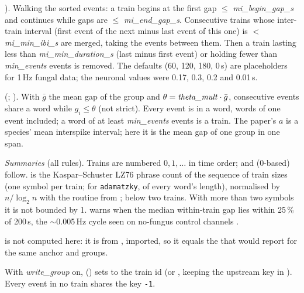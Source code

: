 \begin{description}
  \citet{cotterill2016comparison}). Walking the sorted events: a train begins at the first
  gap $\le$ \emph{mi\_begin\_gap\_s} and continues while gaps are $\le$
  \emph{mi\_end\_gap\_s}. Consecutive trains whose inter-train interval (first event of the
  next minus last event of this one) is $<$ \emph{mi\_min\_ibi\_s} are merged, taking the
  events between them. Then a train lasting less than \emph{mi\_min\_duration\_s} (last minus
  first event) or holding fewer than \emph{min\_events} events is removed. The defaults
  (60, 120, 180, 0\,s) are placeholders for 1\,Hz fungal data; the neuronal values were
  0.17, 0.3, 0.2 and 0.01\,s.
\item[\texttt{adamatzky}] (; \citet{adamatzky2022language}). With
  $\bar g$ the mean gap of the group and $\theta = \text{\emph{theta\_mult}}\cdot\bar g$,
  consecutive events share a word while $g_i \le \theta$ (not strict). Every event is in a
  word, words of one event included; a word of at least \emph{min\_events} events is a
  train. The paper's $a$ is a species' mean interspike interval; here it is the mean gap of
  one group in one span.
\end{description}

\emph{Summaries} (all rules). Trains are numbered $0,1,\dots$ in time order;
 and  (0-based) follow.  is the
Kaspar--Schuster LZ76 phrase count of the sequence of train sizes (one symbol per train; for
\texttt{adamatzky}, of every word's length), normalised by $n/\log_2 n$ with the routine
 from ;
 below two trains. With more than two symbols it is not bounded by 1.
 warns when the median within-train gap lies within 25\,\% of 200\,s,
the $\sim$0.005\,Hz cycle seen on no-fungus control channels \citep{buffi2025electrical}.

 is not computed here: it is  from
, imported, so it equals the
 that  would report for the same
anchor and groups.

With \emph{write\_group} on, 
() sets  to the train id (or
, keeping the upstream key in ). Every event
in no train shares the key \texttt{-1}.

